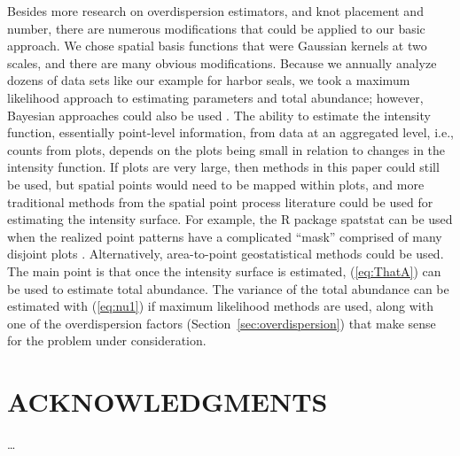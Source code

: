 \documentclass[12pt, titlepage]{article}\usepackage[]{graphicx}\usepackage[]{color}
\begin{document}
Besides more research on overdispersion estimators, and knot placement and number, there are numerous modifications that could be applied to our basic approach. We chose spatial basis functions that were Gaussian kernels at two scales, and there are many obvious modifications.  Because we annually analyze dozens of data sets like our example for harbor seals, we took a maximum likelihood approach to estimating parameters and total abundance; however, Bayesian approaches could also be used \citep{Wikl:spat:2002, Chri:Waag:baye:2002}.  The ability to estimate the intensity function, essentially point-level information, from data at an aggregated level, i.e., counts from plots, depends on the plots being small in relation to changes in the intensity function. If plots are very large, then methods in this paper could still be used, but spatial points would need to be mapped within plots, and more traditional methods from the spatial point process literature could be used for estimating the intensity surface. For example, the R \citep{R:Deve:Core:ALan:2014} package spatstat \citep{Badd:Turn:spat:2005} can be used when the realized point patterns have a complicated ``mask'' comprised of many disjoint plots \citep{Badd:Turn:mode:2006}. Alternatively, area-to-point geostatistical methods \citep{Kyri:geos:2004} could be used. The main point is that once the intensity surface is estimated, (\ref{eq:ThatA}) can be used to estimate total abundance.  The variance of the total abundance can be estimated with (\ref{eq:nu1}) if maximum likelihood methods are used, along with one of the overdispersion factors (Section~\ref{sec:overdispersion}) that make sense for the problem under consideration.

 
\section*{ACKNOWLEDGMENTS} 

\dots

\end{document}
